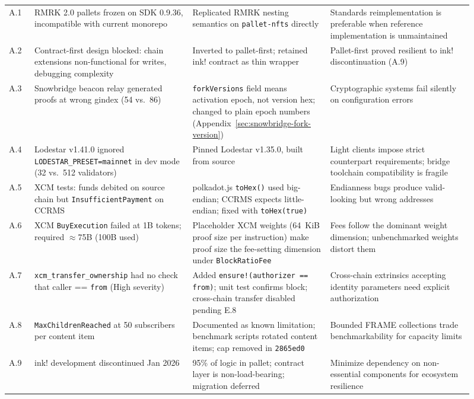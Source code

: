 \begin{longtable}{@{}L{0.05\linewidth} L{0.31\linewidth} L{0.27\linewidth} L{0.28\linewidth}@{}}
A.1 & RMRK 2.0 pallets frozen on SDK 0.9.36, incompatible with current monorepo & Replicated RMRK nesting semantics on \texttt{pallet-nfts} directly & Standards reimplementation is preferable when reference implementation is unmaintained \\
\addlinespace
A.2 & Contract-first design blocked: chain extensions non-functional for writes, debugging complexity & Inverted to pallet-first; retained ink! contract as thin wrapper & Pallet-first proved resilient to ink! discontinuation (A.9) \\
\addlinespace
A.3 & Snowbridge beacon relay generated proofs at wrong gindex (54 vs.\ 86) & \texttt{forkVersions} field means activation epoch, not version hex; changed to plain epoch numbers (Appendix~\ref{sec:snowbridge-fork-version}) & Cryptographic systems fail silently on configuration errors \\
\addlinespace
A.4 & Lodestar v1.41.0 ignored \texttt{LODESTAR\_PRESET=mainnet} in dev mode (32 vs.\ 512 validators) & Pinned Lodestar v1.35.0, built from source & Light clients impose strict counterpart requirements; bridge toolchain compatibility is fragile \\
\addlinespace
A.5 & XCM tests: funds debited on source chain but \texttt{InsufficientPayment} on CCRMS & polkadot.js \texttt{toHex()} used big-endian; CCRMS expects little-endian; fixed with \texttt{toHex(true)} & Endianness bugs produce valid-looking but wrong addresses \\
\addlinespace
A.6 & XCM \texttt{BuyExecution} failed at 1B tokens; required ${\approx}$75B (100B used) & Placeholder XCM weights (64~KiB proof size per instruction) make proof size the fee-setting dimension under \texttt{BlockRatioFee} & Fees follow the dominant weight dimension; unbenchmarked weights distort them \\
\addlinespace
A.7 & \texttt{xcm\_transfer\_ownership} had no check that caller == \texttt{from} (High severity) & Added \texttt{ensure!(authorizer == from)}; unit test confirms block; cross-chain transfer disabled pending E.8 & Cross-chain extrinsics accepting identity parameters need explicit authorization \\
\addlinespace
A.8 & \texttt{MaxChildrenReached} at 50 subscribers per content item & Documented as known limitation; benchmark scripts rotated content items; cap removed in \texttt{2865ed0} & Bounded FRAME collections trade benchmarkability for capacity limits \\
\addlinespace
A.9 & ink! development discontinued Jan 2026 & 95\% of logic in pallet; contract layer is non-load-bearing; migration deferred & Minimize dependency on non-essential components for ecosystem resilience \\
\end{longtable}

